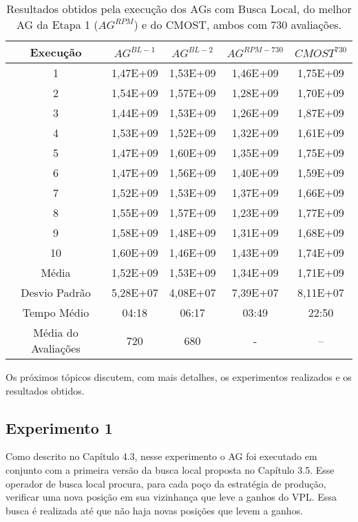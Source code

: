 \begin{table}[H]
\centering
\caption{Resultados obtidos pela execução dos AGs com Busca Local, do melhor AG da Etapa 1 ($AG^{RPM}$) e do CMOST, ambos com 730 avaliações.}
\label{tab:results2_1}
\begin{tabular}{|c|c|c|c|c|}
\hline
Execução & $AG^{BL-1}$ & $AG^{BL-2}$ & $AG^{RPM-730}$ & $CMOST^{730}$ \\ \hline
1 & 1,47E+09 & 1,53E+09 & 1,46E+09 & 1,75E+09 \\ \hline
2 & 1,54E+09 & 1,57E+09 & 1,28E+09 & 1,70E+09 \\ \hline
3 & 1,44E+09 & 1,53E+09	& 1,26E+09 & 1,87E+09 \\ \hline
4 & 1,53E+09 & 1,52E+09 & 1,32E+09 & 1,61E+09 \\ \hline
5 & 1,47E+09 & 1,60E+09 & 1,35E+09 & 1,75E+09 \\ \hline
6 & 1,47E+09 & 1,56E+09 & 1,40E+09 & 1,59E+09 \\ \hline
7 & 1,52E+09 & 1,53E+09 & 1,37E+09 & 1,66E+09 \\ \hline
8 & 1,55E+09 & 1,57E+09 & 1,23E+09 & 1,77E+09 \\ \hline
9 & 1,58E+09 & 1,48E+09 & 1,31E+09 & 1,68E+09 \\ \hline
10 & 1,60E+09 & 1,46E+09 & 1,43E+09 & 1,74E+09\\ \hline
Média & 1,52E+09 & 1,53E+09 & 1,34E+09 & 1,71E+09\\ \hline
Desvio Padrão & 5,28E+07 & 4,08E+07 & 7,39E+07 & 8,11E+07\\ \hline
Tempo Médio & 04:18 & 06:17 & 03:49 & 22:50\\ \hline
Média do Avaliações & 720 & 680	 & - & --\\ \hline

\end{tabular}
\end{table}

Os próximos tópicos discutem, com mais detalhes, os experimentos realizados e os resultados obtidos. 


\subsection{Experimento 1}

Como descrito no Capítulo 4.3, nesse experimento o AG foi executado em conjunto com a primeira versão da busca local proposta no Capítulo 3.5. Esse operador de busca local procura, para cada poço da estratégia de produção, verificar uma nova posição em sua vizinhança que leve a ganhos do VPL. Essa busca é realizada até que não haja novas posições que levem a ganhos.

